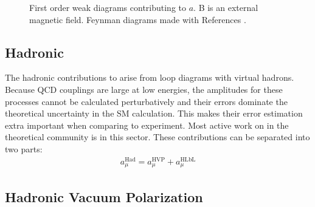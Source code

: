 \begin{figure}
\caption[Electroweak diagrams contributing to the magnetic moment]{First order weak diagrams contributing to $a$. B is an external magnetic field. Feynman diagrams made with References \cite{tikz-feynman,tikz-feynhand}.}	
\label{fig:EWDiagrams}
\end{figure}


\subsection{Hadronic}
\label{subsec:Hadronic}

The hadronic contributions to \amu arise from loop diagrams with virtual hadrons. Because QCD couplings are large at low energies, the amplitudes for these processes cannot be calculated perturbatively and their errors dominate the theoretical uncertainty in the SM calculation. This makes their error estimation extra important when comparing to experiment. Most active work on \amu in the theoretical community is in this sector. These contributions can be separated into two parts:
		\begin{align}
            a_{\mu}^{\text{Had}} = a_{\mu}^{\text{HVP}} + a_{\mu}^{\text{HLbL}}
        \label{eq:HadSplit}
		\end{align}


\subsection*{Hadronic Vacuum Polarization}
\label{subsec:HVP}

